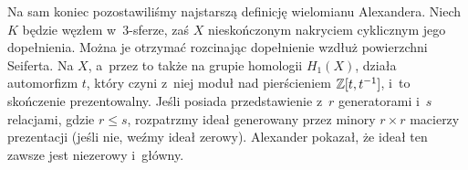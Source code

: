 Na sam koniec pozostawiliśmy najstarszą definicję wielomianu Alexandera.
Niech $K$ będzie węzłem w~3-sferze, zaś $X$ nieskończonym nakryciem cyklicznym jego dopełnienia.
Można je otrzymać rozcinając dopełnienie wzdłuż powierzchni Seiferta.
Na $X$, a~przez to także na grupie homologii $H_1(X)$, działa automorfizm $t$, który czyni z~niej moduł nad pierścieniem $\mathbb Z[t, t^{-1}]$, i~to skończenie prezentowalny.
Jeśli posiada przedstawienie z~$r$ generatorami i~$s$ relacjami, gdzie $r \le s$, rozpatrzmy ideał generowany przez minory $r \times r$ macierzy prezentacji (jeśli nie, weźmy ideał zerowy).
Alexander pokazał, że ideał ten zawsze jest niezerowy i~główny.

